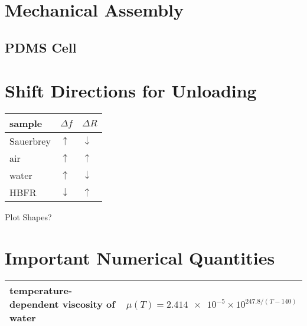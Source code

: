 \documentclass[a4paper]{article}
\begin{document}
\section{Mechanical Assembly}
\subsection{PDMS Cell}

\section{Shift Directions for Unloading}
\begin{tabular}{lll}
  \toprule
  sample    & $\Delta f$   & $\Delta R$   \\
  \midrule
  Sauerbrey & $\uparrow$   & $\downarrow$ \\
  air       & $\uparrow$   & $\uparrow$   \\
  water     & $\uparrow$   & $\downarrow$ \\
  HBFR      & $\downarrow$ & $\uparrow$   \\
  \bottomrule
\end{tabular}

Plot Shapes?
\section{Important Numerical Quantities}
\begin{table}
  \centering
  \begin{tabularx}{\textwidth}{ l l }
    \toprule
    temperature-dependent viscosity of water & $\mu(T)=\num{2.414e-5}\times 10^{247.8/(T-140)}$ \\
    \bottomrule
  \end{tabularx}
\end{table}
\end{document}
